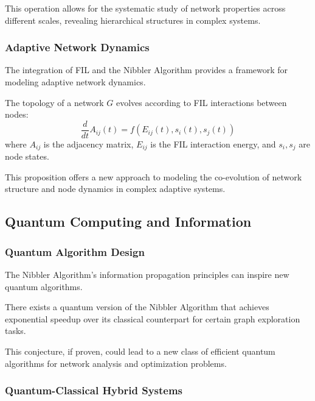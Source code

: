 This operation allows for the systematic study of network properties across different scales, revealing hierarchical structures in complex systems.

\subsubsection{Adaptive Network Dynamics}

The integration of FIL and the Nibbler Algorithm provides a framework for modeling adaptive network dynamics.

\begin{proposition}
The topology of a network $G$ evolves according to FIL interactions between nodes:
\begin{equation}
    \frac{d}{dt}A_{ij}(t) = f(E_{ij}(t), s_i(t), s_j(t))
\end{equation}
where $A_{ij}$ is the adjacency matrix, $E_{ij}$ is the FIL interaction energy, and $s_i, s_j$ are node states.
\end{proposition}

This proposition offers a new approach to modeling the co-evolution of network structure and node dynamics in complex adaptive systems.

\subsection{Quantum Computing and Information}

\subsubsection{Quantum Algorithm Design}

The Nibbler Algorithm's information propagation principles can inspire new quantum algorithms.

\begin{conjecture}
There exists a quantum version of the Nibbler Algorithm that achieves exponential speedup over its classical counterpart for certain graph exploration tasks.
\end{conjecture}

This conjecture, if proven, could lead to a new class of efficient quantum algorithms for network analysis and optimization problems.

\subsubsection{Quantum-Classical Hybrid Systems}

